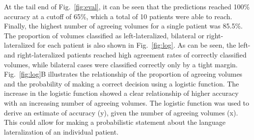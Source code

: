 \documentclass[fleqn,10pt]{SelfArx} %
\begin{document}
At the tail end of Fig.~\ref{fig:eval}, it can be seen that the predictions reached 100\% accuracy at a cutoff of 65\%, which a total of 10 patients were able to reach. Finally, the highest number of agreeing volumes for a single patient was 85.5\%.\\
The proportion of volumes classified as left-lateralized, bilateral or right-lateralized for each patient is also shown in Fig.~\ref{fig:log}. As can be seen, the left- and right-lateralized patients reached high agreement rates of correctly classified volumes, while bilateral cases were classified correctly only by a tight margin. Fig.~\ref{fig:log}B illustrates the relationship of the proportion of agreeing volumes and the probability of making a correct decision using a logistic function. The increase in the logistic function showed a clear relationship of higher accuracy with an increasing number of agreeing volumes. The logistic function was used to derive an estimate of accuracy (y), given the number of agreeing volumes (x). This could allow for making a probabilistic statement about the language lateralization of an individual patient.
\end{document}
